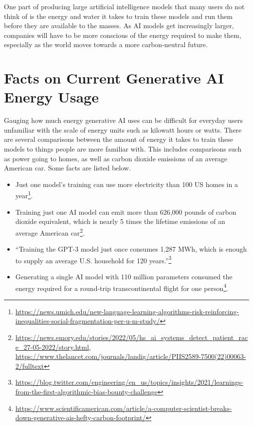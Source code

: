 \documentclass[
]{book}
\begin{document}
One part of producing large artificial intelligence models that many users do not think of is the energy and water it takes to train these models and run them before they are available to the masses. As AI models get increasingly larger, companies will have to be more conscious of the energy required to make them, especially as the world moves towards a more carbon-neutral future.

\hypertarget{facts-on-current-generative-ai-energy-usage}{%
\section{Facts on Current Generative AI Energy Usage}\label{facts-on-current-generative-ai-energy-usage}}

Gauging how much energy generative AI uses can be difficult for everyday users unfamiliar with the scale of energy units such as kilowatt hours or watts. There are several comparisons between the amount of energy it takes to train these models to things people are more familiar with. This includes comparisons such as power going to homes, as well as carbon dioxide emissions of an average American car. Some facts are listed below.

\begin{itemize}
\item
  Just one model's training can use more electricity than 100 US homes in a year\footnote{\url{https://news.umich.edu/new-language-learning-algorithms-risk-reinforcing-inequalities-social-fragmentation-per-u-m-study/}}.
\item
  Training just one AI model can emit more than 626,000 pounds of carbon dioxide equivalent, which is nearly 5 times the lifetime emissions of an average American car\footnote{\url{https://news.emory.edu/stories/2022/05/hs_ai_systems_detect_patient_race_27-05-2022/story.html}, \url{https://www.thelancet.com/journals/landig/article/PIIS2589-7500(22)00063-2/fulltext}}.
\item
  ``Training the GPT-3 model just once consumes 1,287 MWh, which is enough to supply an average U.S. household for 120 years.''\footnote{\url{https://blog.twitter.com/engineering/en_us/topics/insights/2021/learnings-from-the-first-algorithmic-bias-bounty-challenge}}
\item
  Generating a single AI model with 110 million parameters consumed the energy required for a round-trip transcontinental flight for one person\footnote{\url{https://www.scientificamerican.com/article/a-computer-scientist-breaks-down-generative-ais-hefty-carbon-footprint/}}.
\end{itemize}
\end{document}
